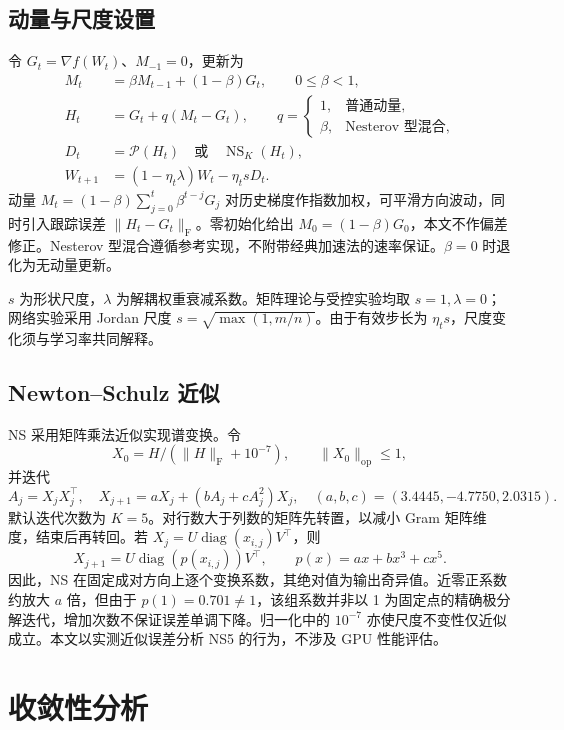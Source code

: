 \documentclass[11pt,a4paper]{article}
\theoremstyle{definition}
\newcommand{\F}{\mathrm{F}}
\newcommand{\op}{\mathrm{op}}
\newcommand{\Pol}{\mathcal{P}}
\begin{document}
\subsection{动量与尺度设置}
令 $G_t=\nabla f(W_t)$、$M_{-1}=0$，更新为
\begin{align}
 M_t&=\beta M_{t-1}+(1-\beta)G_t,\qquad 0\le\beta<1,\\
 H_t&=G_t+q(M_t-G_t),\qquad
 q=\begin{cases}1,&\text{普通动量},\\\beta,&\text{Nesterov 型混合},\end{cases}\\
 D_t&=\Pol(H_t)\quad\text{或}\quad\operatorname{NS}_K(H_t),\\
 W_{t+1}&=(1-\eta_t\lambda)W_t-\eta_t sD_t.
 \label{eq:algorithm}
\end{align}
动量 $M_t=(1-\beta)\sum_{j=0}^t\beta^{t-j}G_j$ 对历史梯度作指数加权，可平滑方向波动，同时引入跟踪误差 $\|H_t-G_t\|_\F$。零初始化给出 $M_0=(1-\beta)G_0$，本文不作偏差修正。Nesterov 型混合遵循参考实现，不附带经典加速法的速率保证。$\beta=0$ 时退化为无动量更新。

$s$ 为形状尺度，$\lambda$ 为解耦权重衰减系数。矩阵理论与受控实验均取 $s=1,\lambda=0$；网络实验采用 Jordan 尺度 $s=\sqrt{\max(1,m/n)}$。由于有效步长为 $\eta_t s$，尺度变化须与学习率共同解释。

\subsection{Newton--Schulz 近似}
NS 采用矩阵乘法近似实现谱变换。令
\[
 X_0=H/(\|H\|_\F+10^{-7}),\qquad \|X_0\|_\op\le1,
\]
并迭代
\begin{equation}
 A_j=X_jX_j^\top,\quad X_{j+1}=aX_j+(bA_j+cA_j^2)X_j,
 \quad (a,b,c)=(3.4445,-4.7750,2.0315).
 \label{eq:NS}
\end{equation}
默认迭代次数为 $K=5$。对行数大于列数的矩阵先转置，以减小 Gram 矩阵维度，结束后再转回。若 $X_j=U\operatorname{diag}(x_{i,j})V^\top$，则
\[
 X_{j+1}=U\operatorname{diag}(p(x_{i,j}))V^\top,\qquad
 p(x)=ax+bx^3+cx^5.
\]
因此，NS 在固定成对方向上逐个变换系数，其绝对值为输出奇异值。近零正系数约放大 $a$ 倍，但由于 $p(1)=0.701\ne1$，该组系数并非以 1 为固定点的精确极分解迭代，增加次数不保证误差单调下降。归一化中的 $10^{-7}$ 亦使尺度不变性仅近似成立。本文以实测近似误差分析 NS5 的行为，不涉及 GPU 性能评估。

\section{收敛性分析}
\end{document}
